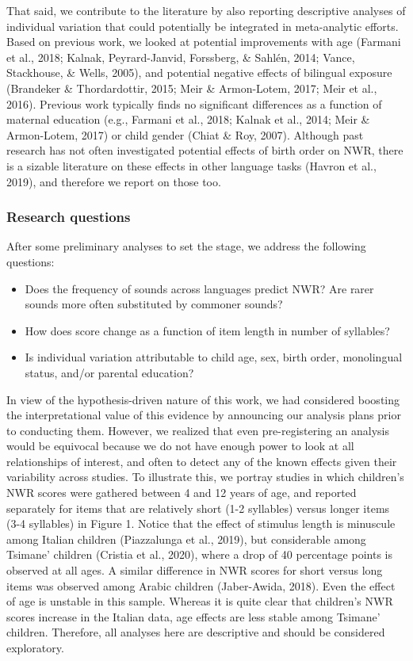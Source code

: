 \documentclass[english,,man,floatsintext]{apa6}
\providecommand{\tightlist}{%
  \setlength{\itemsep}{0pt}\setlength{\parskip}{0pt}}
\begin{document}
That said, we contribute to the literature by also reporting descriptive analyses of individual variation that could potentially be integrated in meta-analytic efforts. Based on previous work, we looked at potential improvements with age (Farmani et al., 2018; Kalnak, Peyrard-Janvid, Forssberg, \& Sahlén, 2014; Vance, Stackhouse, \& Wells, 2005), and potential negative effects of bilingual exposure (Brandeker \& Thordardottir, 2015; Meir \& Armon-Lotem, 2017; Meir et al., 2016). Previous work typically finds no significant differences as a function of maternal education (e.g., Farmani et al., 2018; Kalnak et al., 2014; Meir \& Armon-Lotem, 2017) or child gender (Chiat \& Roy, 2007). Although past research has not often investigated potential effects of birth order on NWR, there is a sizable literature on these effects in other language tasks (Havron et al., 2019), and therefore we report on those too.

\hypertarget{research-questions}{%
\subsubsection{Research questions}\label{research-questions}}

After some preliminary analyses to set the stage, we address the following questions:

\begin{itemize}
\tightlist
\item
  Does the frequency of sounds across languages predict NWR? Are rarer sounds more often substituted by commoner sounds?
\item
  How does score change as a function of item length in number of syllables?
\item
  Is individual variation attributable to child age, sex, birth order, monolingual status, and/or parental education?
\end{itemize}

In view of the hypothesis-driven nature of this work, we had considered boosting the interpretational value of this evidence by announcing our analysis plans prior to conducting them. However, we realized that even pre-registering an analysis would be equivocal because we do not have enough power to look at all relationships of interest, and often to detect any of the known effects given their variability across studies. To illustrate this, we portray studies in which children's NWR scores were gathered between 4 and 12 years of age, and reported separately for items that are relatively short (1-2 syllables) versus longer items (3-4 syllables) in Figure 1. Notice that the effect of stimulus length is minuscule among Italian children (Piazzalunga et al., 2019), but considerable among Tsimane' children (Cristia et al., 2020), where a drop of 40 percentage points is observed at all ages. A similar difference in NWR scores for short versus long items was observed among Arabic children (Jaber-Awida, 2018). Even the effect of age is unstable in this sample. Whereas it is quite clear that children's NWR scores increase in the Italian data, age effects are less stable among Tsimane' children. Therefore, all analyses here are descriptive and should be considered exploratory.
\end{document}
